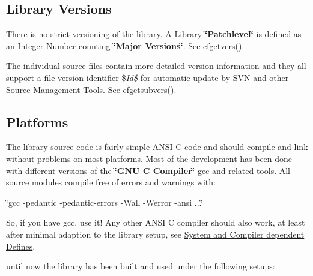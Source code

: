 \hypertarget{development_versions}{}\subsection{Library Versions}\label{development_versions}
There is no strict versioning of the library. A Library {\bfseries \char`\"{}\-Patchlevel\char`\"{}} is defined as an Integer Number counting {\bfseries \char`\"{}\-Major Versions\char`\"{}}. See \hyperlink{group__retrieval_gac4e376e3630e9b25655ee0e0b1a54a5b}{cfgetvers()}.

The individual source files contain more detailed version information and they all support a file version identifier {\ttfamily \${\itshape Id\$\/} for} automatic update by S\-V\-N and other Source Management Tools. See \hyperlink{group__retrieval_ga160032675def60398ebfd66589ddc1e5}{cfgetsubvers()}.\hypertarget{development_platforms}{}\subsection{Platforms}\label{development_platforms}
The library source code is fairly simple A\-N\-S\-I C code and should compile and link without problems on most platforms. Most of the development has been done with different versions of the {\bfseries \char`\"{}\-G\-N\-U C Compiler\char`\"{}} {\ttfamily gcc} and related tools. All source modules compile free of errors and warnings with\-:

{\ttfamily \char`\"{}gcc -\/pedantic -\/pedantic-\/errors -\/\-Wall -\/\-Werror -\/ansi ...\char`\"{}} 

So, if you have {\ttfamily gcc}, use it! Any other A\-N\-S\-I C compiler should also work, at least after minimal adaption to the library setup, see \hyperlink{development_compilation_options}{System and Compiler dependent Defines}.

until now the library has been built and used under the following setups\-:



